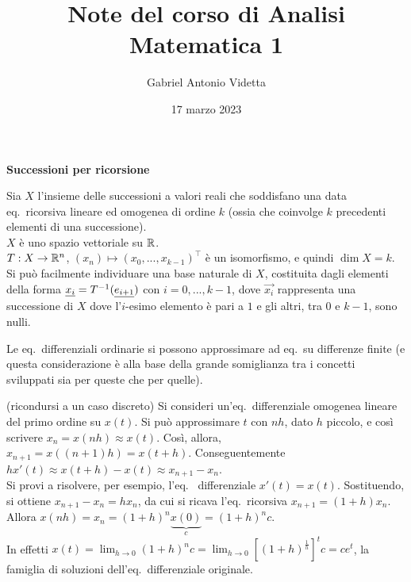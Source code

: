 \documentclass[11pt]{article}
\title{\textbf{Note del corso di Analisi Matematica 1}}
\author{Gabriel Antonio Videtta}
\date{17 marzo 2023}
\begin{document}
\maketitle

\begin{center}
    \Large \textbf{Successioni per ricorsione}
\end{center}

\begin{remark}
Sia $X$ l'insieme delle successioni a valori reali che soddisfano una data
eq.~ricorsiva lineare ed omogenea di ordine $k$ (ossia che coinvolge
$k$ precedenti elementi di una successione). \\

\li $X$ è uno spazio vettoriale su $\mathbb R$. \\
\li $T : X \to \mathbb R^n$, $(x_n) \mapsto (x_0, ..., x_{k-1})^\top$ è
un isomorfismo, e quindi $\dim X = k$. \\
\li Si può facilmente individuare una base naturale di $X$, costituita dagli
elementi della forma $\underline{x_i} = T^{-1}(\underline{e_ {i + 1}})$ con $i = 0, ..., k - 1$,
dove $\vec{x_i}$ rappresenta una successione di $X$ dove l'$i$-esimo elemento
è pari a $1$ e gli altri, tra $0$ e $k-1$, sono nulli.
\end{remark}

\begin{remark}
Le eq.~differenziali ordinarie si possono approssimare
ad eq.~su differenze finite (e questa considerazione è
alla base della grande somiglianza tra i concetti sviluppati
sia per queste che per quelle).
\end{remark}

\begin{example} (ricondursi a un caso discreto) 
Si consideri un'eq.~differenziale omogenea lineare del primo
ordine su $x(t)$. Si può approssimare $t$ con $nh$, dato
$h$ piccolo, e così scrivere $x_n = x(nh) \approx x(t)$.
Così, allora, $x_{n+1} = x((n+1)h) = x(t + h)$. Conseguentemente $h
x'(t) \approx x(t + h) - x(t) \approx x_{n+1} - x_n$. \\

Si provi a risolvere, per esempio, l'eq.~ differenziale $x'(t) = x(t)$.
Sostituendo, si ottiene $x_{n+1} - x_n = h x_n$, da cui
si ricava l'eq.~ricorsiva $x_{n+1} = (1 + h) x_n$. Allora
$x(nh) = x_n = (1 + h)^n \underbrace{x(0)}_c = (1 + h)^n c$. \\

In effetti $x(t) = \displaystyle \lim_{h \to 0} (1 + h)^n c =
\lim_{h \to 0} \left[(1 + h)^{\frac{1}{h}}\right]^t c = c e^t$,
la famiglia di soluzioni dell'eq.~differenziale originale.
\end{example}
\end{document}
